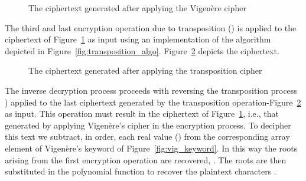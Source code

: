\documentclass[10pt,journal]{IEEEtran}
\begin{document}
\begin{figure}[H]
\centering 
{}
\caption{The ciphertext generated after applying the Vigen\`ere
  cipher}
\label{fig:vig_ciphertext}
\end{figure}

The third and last encryption operation due to transposition
() is applied to the ciphertext of
Figure~\ref{fig:vig_ciphertext} as input using an implementation of
the algorithm depicted in
Figure~\ref{fig:transposition_algo}. Figure~\ref{fig:tr_ciphertext}
depicts the ciphertext.

\begin{figure}[H]
\centering 
{}
\caption{The ciphertext generated after applying the transposition cipher}
\label{fig:tr_ciphertext}
\end{figure}

The inverse decryption process proceeds with reversing the
transposition process ) applied to the last
ciphertext generated by the transposition
operation-Figure~\ref{fig:tr_ciphertext} as input. This operation must
result in the ciphertext of Figure~\ref{fig:vig_ciphertext}, i.e.,
that generated by applying Vigen\`ere's cipher in the encryption
process. To decipher this text we subtract, in order, each real value
() from the corresponding array element of Vigen\`ere's keyword
of Figure~\ref{fig:vig_keyword}. In this way the roots arising from
the first encryption operation are recovered, . The roots are then substituted in the polynomial function
to recover the plaintext characters .
\newline
\end{document}
